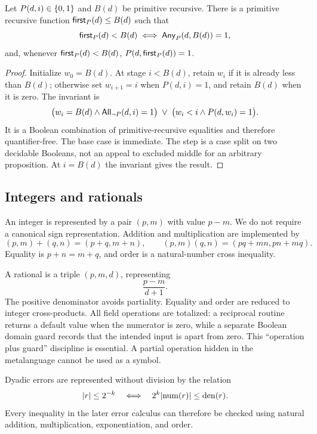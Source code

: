 \begin{lemma}
Let \(P(d,i)\in\{0,1\}\) and \(B(d)\) be primitive recursive.  There is a primitive
recursive function \(\mathsf{first}_P(d)\le B(d)\) such that
\[
 \mathsf{first}_P(d)<B(d)\;\Longleftrightarrow\;
 \mathsf{Any}_P(d,B(d))=1,
\]
and, whenever \(\mathsf{first}_P(d)<B(d)\),
\(P(d,\mathsf{first}_P(d))=1\).
\end{lemma}

\begin{proof}
Initialize \(w_0=B(d)\).  At stage \(i<B(d)\), retain \(w_i\) if it is already
less than \(B(d)\); otherwise set \(w_{i+1}=i\) when \(P(d,i)=1\), and retain
\(B(d)\) when it is zero.  The invariant is
\[
  \bigl(w_i=B(d)\wedge \mathsf{All}_{\neg P}(d,i)=1\bigr)
  \;\vee\;
  \bigl(w_i<i\wedge P(d,w_i)=1\bigr).
\]
It is a Boolean combination of primitive-recursive equalities and therefore
quantifier-free.  The base case is immediate.  The step is a case split on
two decidable Booleans, not an appeal to excluded middle for an arbitrary
proposition.  At \(i=B(d)\) the invariant gives the result.
\end{proof}

\subsection{Integers and rationals}

An integer is represented by a pair \((p,m)\) with value \(p-m\).  We do not
require a canonical sign representation.  Addition and multiplication are
implemented by
\[
 (p,m)+(q,n)=(p+q,m+n),
 \qquad
 (p,m)(q,n)=(pq+mn,pn+mq).
\]
Equality is \(p+n=m+q\), and order is a natural-number cross inequality.

A rational is a triple \((p,m,d)\), representing
\[
        \frac{p-m}{d+1}.
\]
The positive denominator avoids partiality.  Equality and order are reduced
to integer cross-products.  All field operations are totalized: a reciprocal
routine returns a default value when the numerator is zero, while a separate
Boolean domain guard records that the intended input is apart from zero.
This ``operation plus guard'' discipline is essential.  A partial operation
hidden in the metalanguage cannot be used as a  symbol.

Dyadic errors are represented without division by the relation
\[
       \lvert r\rvert\le 2^{-k}
       \quad\Longleftrightarrow\quad
       2^k\lvert \mathrm{num}(r)\rvert\le \mathrm{den}(r).
\]
Every inequality in the later error calculus can therefore be checked using
natural addition, multiplication, exponentiation, and order.

